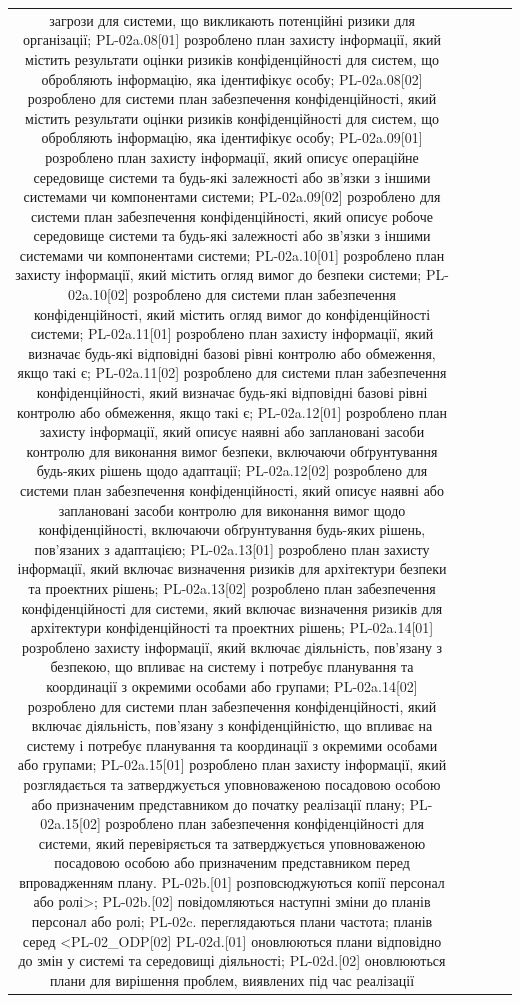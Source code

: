 \documentclass[10pt]{article}
\begin{document}
\begin{longtable}{|c|>{\raggedright\arraybackslash}p{2.5cm}|>{\raggedright\arraybackslash}p{4cm}|>{\raggedright\arraybackslash}p{3.5cm}|>{\raggedright\arraybackslash}p{5.5cm}|}
загрози для системи, що викликають потенційні ризики для організації; PL-02a.08[01] розроблено план захисту інформації, який містить результати оцінки ризиків конфіденційності для систем, що обробляють інформацію, яка ідентифікує особу; PL-02a.08[02] розроблено для системи план забезпечення конфіденційності, який містить результати оцінки ризиків конфіденційності для систем, що обробляють інформацію, яка ідентифікує особу; PL-02a.09[01] розроблено план захисту інформації, який описує операційне середовище системи та будь-які залежності або зв'язки з іншими системами чи компонентами системи; PL-02a.09[02] розроблено для системи план забезпечення конфіденційності, який описує робоче середовище системи та будь-які залежності або зв'язки з іншими системами чи компонентами системи; PL-02a.10[01] розроблено план захисту інформації, який містить огляд вимог до безпеки системи; PL-02a.10[02] розроблено для системи план забезпечення конфіденційності, який містить огляд вимог до конфіденційності системи; PL-02a.11[01] розроблено план захисту інформації, який визначає будь-які відповідні базові рівні контролю або обмеження, якщо такі є; PL-02a.11[02] розроблено для системи план забезпечення конфіденційності, який визначає будь-які відповідні базові рівні контролю або обмеження, якщо такі є; PL-02a.12[01] розроблено план захисту інформації, який описує наявні або заплановані засоби контролю для виконання вимог безпеки, включаючи обґрунтування будь-яких рішень щодо адаптації; PL-02a.12[02] розроблено для системи план забезпечення конфіденційності, який описує наявні або заплановані засоби контролю для виконання вимог щодо конфіденційності, включаючи обґрунтування будь-яких рішень, пов'язаних з адаптацією; PL-02a.13[01] розроблено план захисту інформації, який включає визначення ризиків для архітектури безпеки та проектних рішень; PL-02a.13[02] розроблено план забезпечення конфіденційності для системи, який включає визначення ризиків для архітектури конфіденційності та проектних рішень; PL-02a.14[01] розроблено захисту інформації, який включає діяльність, пов'язану з безпекою, що впливає на систему і потребує планування та координації з окремими особами або групами; PL-02a.14[02] розроблено для системи план забезпечення конфіденційності, який включає діяльність, пов'язану з конфіденційністю, що впливає на систему і потребує планування та координації з окремими особами або групами; PL-02a.15[01] розроблено план захисту інформації, який розглядається та затверджується уповноваженою посадовою особою або призначеним представником до початку реалізації плану; PL-02a.15[02] розроблено план забезпечення конфіденційності для системи, який перевіряється та затверджується уповноваженою посадовою особою або призначеним представником перед впровадженням плану. PL-02b.[01] розповсюджуються копії персонал або ролі>; PL-02b.[02] повідомляються наступні зміни до планів персонал або ролі; PL-02c. переглядаються плани частота; планів серед <PL-02\_\allowbreak{}ODP[02] PL-02d.[01] оновлюються плани відповідно до змін у системі та середовищі діяльності; PL-02d.[02] оновлюються плани для вирішення проблем, виявлених під час реалізації 
\end{longtable}
\end{document}
